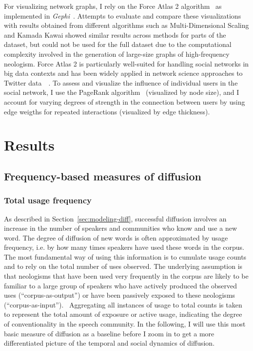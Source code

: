 \documentclass[
  a4paper,
  abstract=on,
  captions=tableabove
  ]{scrartcl}
\begin{document}
  For visualizing network graphs, I rely on the Force Atlas 2 algorithm~\parencite{Jacomy2014ForceAtlas2Continuous} as implemented in \emph{Gephi}~\parencite{Bastian2009GephiOpen}. Attempts to evaluate and compare these visualizations with results obtained from different algorithms such as Multi-Dimensional Scaling and Kamada Kawai showed similar results across methods for parts of the dataset, but could not be used for the full dataset due to the computational complexity involved in the generation of large-size graphs of high-frequency neologism. Force Atlas 2 is particularly well-suited for handling social networks in big data contexts and has been widely applied in network science approaches to Twitter data~ \parencite{Bruns2012HowLong,Gerlitz2013MiningOne,Bliss2012TwitterReciprocal}. To assess and visualize the influence of individual users in the social network, I use the PageRank algorithm~\parencite{Brin1998AnatomyLargeScale} (visualized by node size), and I account for varying degrees of strength in the connection between users by using edge weigths for repeated interactions (visualized by edge thickness).

\section{Results}
  \label{sec:results}

  \subsection{Frequency-based measures of diffusion}
    \label{subsec:freq}

    \subsubsection{Total usage frequency}
      \label{subsec:total-freq}

      As described in Section~\ref{sec:modeling-diff}, successful diffusion involves an increase in the number of speakers and communities who know and use a new word. The degree of diffusion of new words is often approximated by usage frequency, i.e. by how many times speakers have used these words in the corpus. The most fundamental way of using this information is to cumulate usage counts and to rely on the total number of uses observed. The underlying assumption is that neologisms that have been used very frequently in the corpus are likely to be familiar to a large group of speakers who have actively produced the observed uses (\enquote{corpus-as-output}) or have been passively exposed to these neologisms (\enquote{corpus-as-input}).~\parencite{Stefanowitsch2017CorpusbasedPerspective} Aggregating all instances of usage to total counts is taken to represent the total amount of exposure or active usage, indicating the degree of conventionality in the speech community. In the following, I will use this most basic measure of diffusion as a baseline before I zoom in to get a more differentiated picture of the temporal and social dynamics of diffusion.
\end{document}
